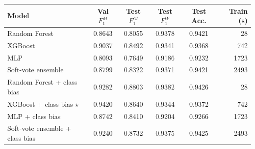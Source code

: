 \begin{tabular}{lccccr}
\toprule
Model & Val $F_1^{M}$ & Test $F_1^{M}$ & Test $F_1^{W}$ & Test Acc. & Train (s) \\
\midrule
Random Forest & 0.8643 & 0.8055 & 0.9378 & 0.9421 & 28 \\
XGBoost & 0.9037 & 0.8492 & 0.9341 & 0.9368 & 742 \\
MLP & 0.8093 & 0.7649 & 0.9186 & 0.9232 & 1723 \\
Soft-vote ensemble & 0.8799 & 0.8322 & 0.9371 & 0.9421 & 2493 \\
Random Forest + class bias & 0.9282 & 0.8803 & 0.9382 & 0.9426 & 28 \\
XGBoost + class bias $\star$ & 0.9420 & 0.8640 & 0.9344 & 0.9372 & 742 \\
MLP + class bias & 0.8742 & 0.8410 & 0.9204 & 0.9266 & 1723 \\
Soft-vote ensemble + class bias & 0.9240 & 0.8732 & 0.9375 & 0.9425 & 2493 \\
\bottomrule
\end{tabular}
